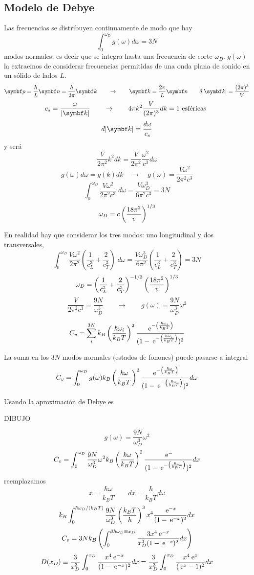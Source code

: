 \documentclass[10pt,oneside]{CBFT_book}
\begin{document}
\subsection{Modelo de Debye}

Las frecuencias se distribuyen continuamente de modo que hay 
\[
	\int_0^{\omega_D} g(\omega) d\omega = 3N
\]
modos normales; es decir que se integra hasta una frecuencia de corte $\omega_D$. $g(\omega)$ la extraemos de 
considerar frecuencias permitidas de una onda plana de sonido en un sólido de lados $L$.
\[
	\vb{p} = \frac{h}{L}\vb{n} = \frac{h}{2\pi}\vb{k} \qquad \rightarrow  \qquad \vb{k} = \frac{2\pi}{L}\vb{n}
	\qquad \delta |\vb{k}| = \frac{(2\pi)^3}{V}
\]
\[
	c_s = \frac{\omega}{|\vb{k}|} \qquad \rightarrow \qquad  4 \pi k^2 \frac{V}{(2\pi)^3} dk = 1 \text{ esféricas }
\]
\[
	d|\vb{k}| = \frac{d\omega}{c_s}
\]
y será 
\[
	\frac{V}{2\pi^2} k^2 dk = \frac{V}{2\pi^2} \frac{\omega^2}{c^3} d\omega
\]
\[
	g(\omega) d\omega = g(k) dk \quad \rightarrow \quad g(\omega) = \frac{V\omega^2}{2\pi^2c^3}
\]
\[
	\int_0^{\omega_D} \frac{V\omega^2}{2\pi^2c^3} \; d\omega = \frac{V\omega_D^3}{6\pi^2 c^3} = 3N
\]
\[
	\omega_D = c \left( \frac{ 18\pi^2 }{ v } \right)^{1/3}
\]

En realidad hay que considerar los tres modos: uno longitudinal y dos transversales,
\[
	\int_0^{\omega_D} \frac{V\omega^2}{2\pi^2} \left( \frac{1}{c_L^3} + \frac{2}{c_T^3} \right) \; d\omega = 
	\frac{V\omega_D^3}{6\pi^2} \left( \frac{1}{c_L^3} + \frac{2}{c_T^3} \right) = 3N
\]
\[
	\omega_D = \left( \frac{1}{c_L^3} + \frac{2}{c_T^3} \right)^{-1/3} \left( \frac{ 18\pi^2 }{ v } \right)^{1/3}
\]
\[
	\frac{V}{2\pi^2c^3} = \frac{9N}{\omega_D^3} \qquad \rightarrow \qquad g(\omega) = \frac{9N}{\omega_D^3} \omega^2
\]


\[
	C_v = \sum_i^{3N} k_B \left( \frac{  \hbar \omega_i  }{  k_B T  } \right)^2 
	\frac{ \:\mathrm{e}^{-\left( \frac{ \hbar\omega_i }{ k_BT } \right)} }{ (1-\:\mathrm{e}^{-\left( \frac{ \hbar\omega_i }{ k_BT } \right)})^2}
\]

La suma en los $ 3N $ modos normales (estados de fonones) puede pasarse a integral 
\[
	C_v = \int_0^{\omega_D} g(\omega) k_B \left( \frac{ \hbar\omega }{ k_BT } \right)^2 
	\frac{ \:\mathrm{e}^{-\left( \frac{ \hbar\omega }{ k_BT } \right)} }{ (1-\:\mathrm{e}^{-\left( \frac{ \hbar\omega }{ k_BT } \right)})^2} d\omega
\]

Usando la aproximación de Debye es 

DIBUJO 

\[
	g(\omega) = \frac{9N}{\omega_D^3} \omega^2
\]
\[
	C_v = \int_0^{\omega_D} \frac{9N}{\omega_D^3} \omega^2 k_B \left( \frac{ \hbar\omega }{ k_BT } \right)^2 
	\frac{ \:\mathrm{e}^{-} }{ (1-\:\mathrm{e}^{-\left( \frac{ \hbar\omega }{ k_BT } \right)})^2} dx 
\]
reemplazamos
\[
	x = \frac{\hbar\omega}{k_B T} \qquad dx = \frac{ \hbar }{k_B T} d\omega
\]
\[
	k_B \int_0^{\hbar \omega_D / ( k_B T )} 
	\frac{9N}{\omega_D^3} \left( \frac{ k_BT }{ \hbar } \right)^3 x^4 \frac{ \:\mathrm{e}^{-x} }{ (1-\:\mathrm{e}^{-x})^2} dx 
\]
\[
	C_v = 3Nk_B \left( 
	\int_0^{\beta \hbar \omega_D \equiv x_D} \frac{ 3 x^4 \:\mathrm{e}^{-x} }{ x_D^3 (1-\:\mathrm{e}^{-x})^2} dx 
	\right)
\]
\[
	D(x_D) \equiv \frac{3}{x_D^3} \int_0^{x_D} \frac{x^4 \:\mathrm{e}^{-x} }{(1-\:\mathrm{e}^{-x})^2} dx 
	= \frac{3}{x_D^3} \int_0^{x_D} \frac{x^4 \:\mathrm{e}^{x} }{( \:\mathrm{e}^{x} - 1 )^2} dx 
\]
\end{document}
